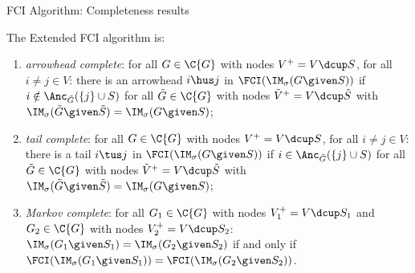 \begin{frame}{FCI Algorithm: Completeness results}
\begin{Thm}[\ref{thm:fci_complete}]
The Extended FCI algorithm is:
  \begin{enumerate}
    \item \emph{arrowhead complete}: for all $G \in \C{G}$ with nodes $V^+ = V \dcup S$, for all $i \ne j \in V$: there is an arrowhead $i \hus j$ in $\FCI(\IM_\sigma(G \given S))$ if $i \notin \Anc_{\tilde{G}}(\{j\} \cup S)$ for all $\tilde{G} \in \C{G}$ with nodes $\tilde{V}^+ = V \dcup \tilde{S}$ with $\IM_\sigma(\tilde{G} \given \tilde{S}) = \IM_\sigma(G \given S)$;
    \item \emph{tail complete}: for all $G \in \C{G}$ with nodes $V^+ = V \dcup S$, for all $i \ne j \in V$: there is a tail $i \tus j$ in $\FCI(\IM_\sigma(G \given S))$ if $i \in \Anc_{\tilde{G}}(\{j\} \cup S)$ for all $\tilde{G} \in \C{G}$ with nodes $\tilde{V}^+ = V \dcup \tilde{S}$ with $\IM_\sigma(\tilde{G} \given \tilde{S}) = \IM_\sigma(G \given S)$;
    \item \emph{Markov complete}: for all $G_1 \in \C{G}$ with nodes $V_1^+ = V \dcup S_1$ and $G_2 \in \C{G}$ with nodes $V_2^+ = V \dcup S_2$: $\IM_\sigma(G_1 \given S_1) = \IM_\sigma(G_2 \given S_2)$ if and only if $\FCI(\IM_\sigma(G_1 \given S_1)) = \FCI(\IM_\sigma(G_2 \given S_2))$.
  \end{enumerate}
\end{Thm}
\end{frame}

